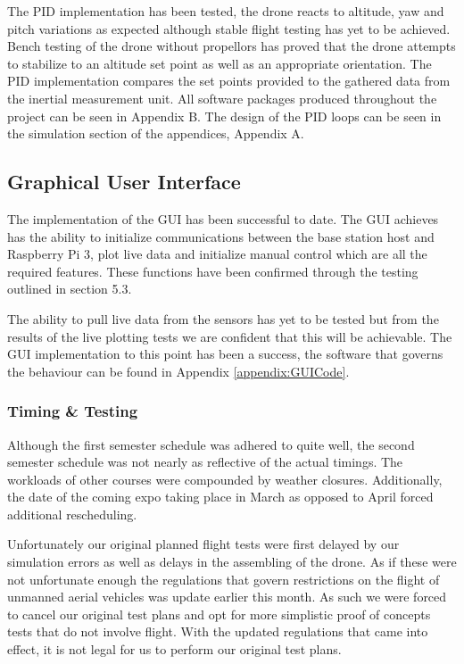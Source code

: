 The PID implementation has been tested, the drone reacts to altitude, yaw and pitch variations as expected although stable flight testing has yet to be achieved. Bench testing of the drone without propellors has proved that the drone attempts to stabilize to an altitude set point as well as an appropriate orientation. The PID implementation compares the set points provided to the gathered data from the inertial measurement unit. All software packages produced throughout the project can be seen in Appendix B. The design of the PID loops can be seen in the simulation section of the appendices, Appendix A.

\subsection{Graphical User Interface}
The implementation of the GUI has been successful to date. The GUI achieves has the ability to initialize communications between the base station host and Raspberry Pi 3, plot live data and initialize manual control which are all the required features. These functions have been confirmed through the testing outlined in section 5.3.

The ability to pull live data from the sensors has yet to be tested but from the results of the live plotting tests we are confident that this will be achievable. The GUI implementation to this point has been a success, the software that governs the behaviour can be found in Appendix \ref{appendix:GUICode}.

\subsubsection{Timing \& Testing}
Although the first semester schedule was adhered to quite well, the second semester schedule was not nearly as reflective of the actual timings.  The workloads of other courses were compounded by weather closures.  Additionally, the date of the coming expo taking place in March as opposed to April forced additional rescheduling.

Unfortunately our original planned flight tests were first delayed by our simulation errors as well as delays in the assembling of the drone.  As if these were not unfortunate enough the regulations that govern restrictions on the flight of unmanned aerial vehicles was update earlier this month.  As such we were forced to cancel our original test plans and opt for more simplistic proof of concepts tests that do not involve flight.  With the updated regulations that came into effect, it is not legal for us to perform our original test plans.


